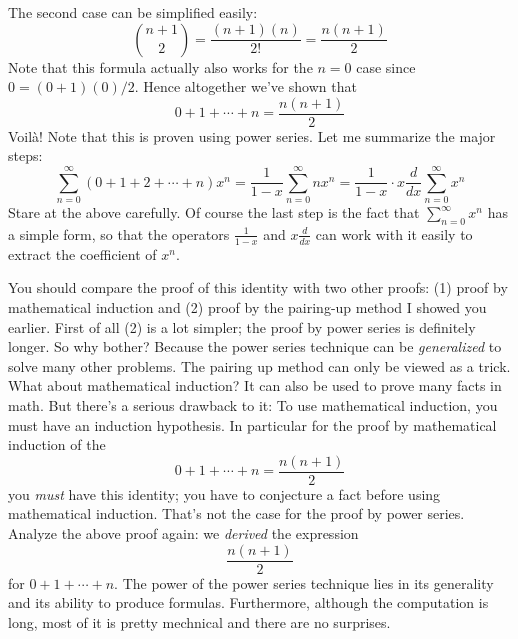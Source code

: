 The second case can be simplified easily: 
\[
\binom{n+1}{2}
= \frac{(n+1)(n)}{2!}
= \frac{n(n+1)}{2}
\]
Note that this formula actually also works for the
$n=0$ case since $0 = (0+1)(0)/2$.
Hence altogether we've shown that 
\[
0 + 1 + \cdots + n = \frac{n(n+1)}{2}
\]
Voil\`a!
Note that this is proven using power series.
Let me summarize the major steps:
\[
\sum_{n=0}^\infty(0 + 1 + 2 + \cdots + n) x^n
= \frac{1}{1-x} \sum_{n=0}^\infty n x^n
= \frac{1}{1-x} \cdot x \frac{d}{dx} \sum_{n=0}^\infty x^n
\]
Stare at the above carefully.
Of course the last step is the fact that $\sum_{n=0}^\infty x^n$ has a simple
form, so that the operators $\displaystyle \frac{1}{1-x}$ and $\displaystyle x \frac{d}{dx}$ can work
with it easily to extract the coefficient of $x^n$.

You should compare the proof of this identity with 
two other proofs:
(1) proof by mathematical induction and
(2) proof by the pairing-up method I showed you earlier.
First of all (2) is a lot simpler;
the proof by power series is definitely longer.
So why bother? 
Because the power series technique can be \textit{generalized} to solve
many other problems.
The pairing up method can only be viewed as a trick.
What about mathematical induction?
It can also be used to prove many facts in math.
But there's a serious drawback to it:
To use mathematical induction, you must have an induction
hypothesis.
In particular for the proof by mathematical induction
of the
\[
0 + 1 + \cdots + n = \frac{n(n+1)}{2}
\]
you \textit{must} have this identity;
you have to conjecture a fact before using mathematical induction.
That's not the case for the proof by power series.
Analyze the above proof again: we \textit{derived} the expression
\[
\frac{n(n+1)}{2}
\]
for $0 + 1 + \cdots + n$.
The power of the power series technique lies in its
generality and its ability to produce formulas.
Furthermore, although the computation is long, most of it is pretty
mechnical and there are no surprises.

